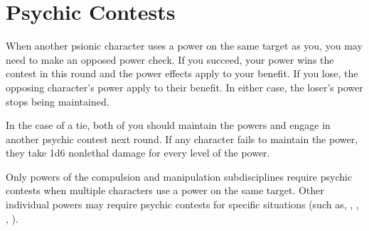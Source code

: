 \section{Psychic Contests}
When another psionic character uses a power on the same target as you, you may need to make an opposed power check. If you succeed, your power wins the contest in this round and the power effects apply to your benefit. If you lose, the opposing character's power apply to their benefit. In either case, the loser's power stops being maintained.

In the case of a tie, both of you should maintain the powers and engage in another psychic contest next round. If any character fails to maintain the power, they take 1d6 nonlethal damage for every level of the power.

Only powers of the compulsion and manipulation subdisciplines require psychic contests when multiple characters use a power on the same target. Other individual powers may require psychic contests for specific situations (such as, , , , ).
